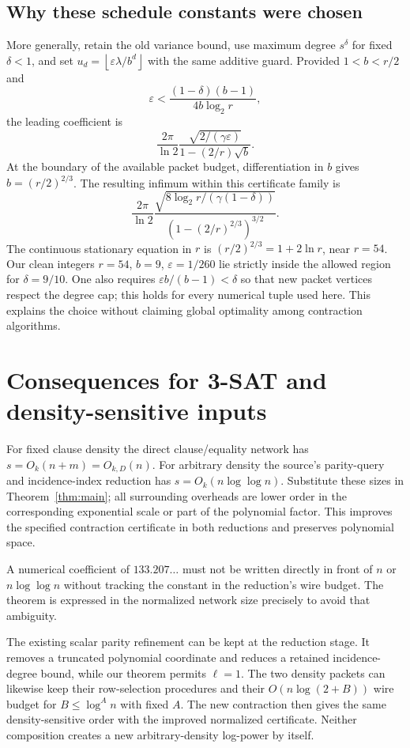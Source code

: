 \documentclass[11pt,letterpaper]{article}
\theoremstyle{definition}\newtheorem{definition}[theorem]{Definition}
\theoremstyle{remark}\newtheorem{remark}[theorem]{Remark}
\newcommand{\floor}[1]{\left\lfloor#1\right\rfloor}
\begin{document}
\subsection{Why these schedule constants were chosen}
More generally, retain the old variance bound, use maximum degree
$s^\delta$ for fixed $\delta<1$, and set
$u_d=\floor{\varepsilon\lambda/b^d}$ with the same additive guard.
Provided $1<b<r/2$ and
\[
 \varepsilon<\frac{(1-\delta)(b-1)}{4b\log_2r},
\]
the leading coefficient is
\begin{equation}\label{eq:parameter-family}
 \frac{2\pi}{\ln2}
 \frac{\sqrt{2/(\gamma\varepsilon)}}{1-(2/r)\sqrt b}.
\end{equation}
At the boundary of the available packet budget, differentiation in
$b$ gives $b=(r/2)^{2/3}$. The resulting infimum within this
certificate family is
\[
 \frac{2\pi}{\ln2}
 \frac{\sqrt{8\log_2r/(\gamma(1-\delta))}}
 {(1-(2/r)^{2/3})^{3/2}}.
\]
The continuous stationary equation in $r$ is
$(r/2)^{2/3}=1+2\ln r$, near $r=54$. Our clean integers
$r=54$, $b=9$, $\varepsilon=1/260$ lie strictly inside the
allowed region for $\delta=9/10$. One also requires
$\varepsilon b/(b-1)<\delta$ so that new packet vertices respect
the degree cap; this holds for every numerical tuple used here.
This explains the choice without
claiming global optimality among contraction algorithms.

\section{Consequences for 3-SAT and density-sensitive inputs}\label{sec:sat}
For fixed clause density the direct clause/equality network has
$s=O_k(n+m)=O_{k,D}(n)$. For arbitrary density the source's
parity-query and incidence-index reduction has
$s=O_k(n\log\log n)$. Substitute these sizes in
Theorem~\ref{thm:main}; all surrounding overheads are lower order
in the corresponding exponential scale or part of the polynomial
factor. This improves the specified contraction certificate in both
reductions and preserves polynomial space.

A numerical coefficient of $133.207\ldots$ must not be written
directly in front of $n$ or $n\log\log n$ without tracking the
constant in the reduction's wire budget. The theorem is expressed
in the normalized network size precisely to avoid that ambiguity.

The existing scalar parity refinement can be kept at the reduction
stage. It removes a truncated polynomial coordinate and reduces a
retained incidence-degree bound, while our theorem permits $\ell=1$.
The two density packets can likewise keep their row-selection
procedures and their $O(n\log(2+B))$ wire budget for
$B\le\log^A n$ with fixed $A$. The new contraction then gives
the same density-sensitive order with the improved normalized
certificate. Neither composition creates a new arbitrary-density
log-power by itself.
\end{document}

